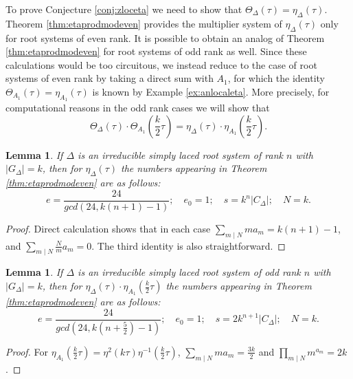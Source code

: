 \documentclass[11pt,a4paper]{amsart}
\newtheorem{lemma}[theorem]{Lemma}
\theoremstyle{definition}
\begin{document}
To prove Conjecture \ref{conj:zloceta} we need to show that $\Theta_{\Delta}(\tau)=\eta_{\Delta}(\tau)$. Theorem \ref{thm:etaprodmodeven} provides the multiplier system of $\eta_{\Delta}(\tau)$ only for root systems of even rank. It is possible to obtain an analog of Theorem \ref{thm:etaprodmodeven} for root systems of odd rank as well. Since these calculations would be too circuitous, we instead reduce to the case of root systems of even rank by taking a direct sum with $A_1$, for which the identity $\Theta_{A_1}(\tau)=\eta_{A_1}(\tau)$ is known by Example \ref{ex:anlocaleta}. More precisely, for computational reasons in the odd rank cases we will show that
\[\Theta_{\Delta}(\tau)\cdot \Theta_{A_1}\left(\frac{k}{2}\tau\right)=\eta_{\Delta}(\tau)\cdot \eta_{A_1}\left(\frac{k}{2}\tau\right).\]	
\begin{lemma}
\label{lem:ee0s}
If $\Delta$ is an irreducible simply laced root system of rank $n$ with $|G_{\Delta}|=k$, then for $\eta_{\Delta}(\tau)$ the numbers appearing in Theorem \ref{thm:etaprodmodeven}	 are as follows:
\[ e=\frac{24}{gcd(24, k(n+1)-1)}; \quad e_0=1; \quad s=k^n|C_{\Delta}|; \quad N=k. \]
\end{lemma}
\begin{proof} Direct calculation shows that in each case $\sum_{m \mid N} ma_m=k(n+1)-1$, and $\sum_{m \mid N} \frac{N}{m}a_m=0$. The third identity is also straightforward.
\end{proof}
\begin{lemma}
\label{lem:ee0sa1}
 If $\Delta$ is an irreducible simply laced root system of odd rank $n$ with $|G_{\Delta}|=k$, then for $\eta_{\Delta}(\tau) \cdot \eta_{A_1}(\frac{k}{2}\tau)$ the numbers appearing in Theorem \ref{thm:etaprodmodeven} are as follows:
\[ e=\frac{24}{gcd(24, k(n+\frac{5}{2})-1)}; \quad e_0=1; \quad s=2k^{n+1}|C_{\Delta}|; \quad N=k. \]
\end{lemma}
\begin{proof} For $\eta_{A_1}(\frac{k}{2}\tau)=\eta^2(k\tau)\eta^{-1}(\frac{k}{2}\tau)$, $\sum_{m \mid N} ma_m=\frac{3k}{2}$ and $\prod_{m \mid N} m^{a_m}=2k$. \end{proof}
\end{document}
